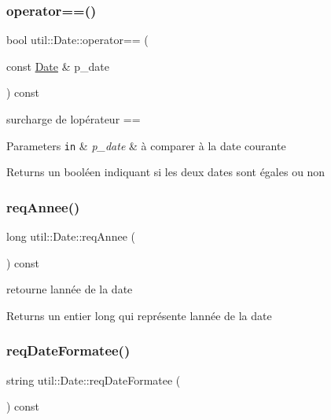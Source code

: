\subsubsection{\texorpdfstring{operator==()}{operator==()}}
{\footnotesize\ttfamily bool util\+::\+Date\+::operator== (\begin{DoxyParamCaption}\item[{const \hyperlink{classutil_1_1Date}{Date} \&}]{p\+\_\+date }\end{DoxyParamCaption}) const}



surcharge de l\textquotesingle{}opérateur == 


\begin{DoxyParams}[1]{Parameters}
\mbox{\tt in}  & {\em p\+\_\+date} & à comparer à la date courante \\
\hline
\end{DoxyParams}
\begin{DoxyReturn}{Returns}
un booléen indiquant si les deux dates sont égales ou non 
\end{DoxyReturn}
\mbox{\label{classutil_1_1Date_aa7c4b428456da55a2e3769e93ad9bb8d}} 
\subsubsection{\texorpdfstring{req\+Annee()}{reqAnnee()}}
{\footnotesize\ttfamily long util\+::\+Date\+::req\+Annee (\begin{DoxyParamCaption}{ }\end{DoxyParamCaption}) const}



retourne l\textquotesingle{}année de la date 

\begin{DoxyReturn}{Returns}
un entier long qui représente l\textquotesingle{}année de la date 
\end{DoxyReturn}
\mbox{\label{classutil_1_1Date_ad92d1e9c4d570c5f31a8e06cf2e1ae8c}} 
\subsubsection{\texorpdfstring{req\+Date\+Formatee()}{reqDateFormatee()}}
{\footnotesize\ttfamily string util\+::\+Date\+::req\+Date\+Formatee (\begin{DoxyParamCaption}{ }\end{DoxyParamCaption}) const}



